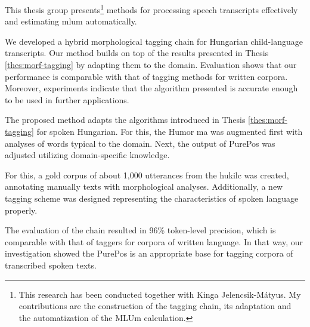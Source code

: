 This thesis group presents\footnote{This research has been conducted together with Kinga Jelencsik-Mátyus. 
My contributions are the construction of the tagging chain, its adaptation and the automatization of the MLUm calculation.} methods for processing speech transcripts effectively and estimating \acrlong{mlum} automatically.


\begin{core}
\begin{thesis}
\label{thes:spoken-morf-tagging}
We developed a hybrid morphological tagging chain for Hungarian child-language transcripts.
Our method builds on top of the results presented in Thesis \ref{thes:morf-tagging} by adapting them to the domain.
Evaluation shows that our performance is comparable with that of tagging methods for written corpora.
Moreover, experiments indicate that the algorithm presented is accurate enough to be used in further applications.
\end{thesis}

\begin{pub}
\cite{Matyus2014,Orosz2014c}
\end{pub}
\end{core}

The proposed method adapts the algorithms introduced in Thesis \ref{thes:morf-tagging} for spoken Hungarian.
For this, the Humor \acrlong{ma} was augmented first with analyses of words typical to the domain.
Next, the output of PurePos was adjusted utilizing domain-specific knowledge.

For this, a gold corpus of about 1,000 utterances from the \acrshort{hukilc} was created, annotating manually texts with morphological analyses. 
Additionally, a new tagging scheme was designed representing the characteristics of spoken language properly.

The evaluation of the chain resulted in 96\% token-level precision, which is comparable with that of taggers for corpora of written language.
In that way, our investigation showed the PurePos is an appropriate base for tagging corpora of transcribed spoken texts.

\thesisline%


